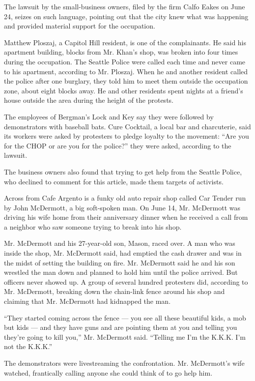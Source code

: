 The lawsuit by the small-business owners, filed by the firm Calfo Eakes
on June 24, seizes on such language, pointing out that the city knew
what was happening and provided material support for the occupation.

Matthew Ploszaj, a Capitol Hill resident, is one of the complainants. He
said his apartment building, blocks from Mr. Khan's shop, was broken
into four times during the occupation. The Seattle Police were called
each time and never came to his apartment, according to Mr. Ploszaj.
When he and another resident called the police after one burglary, they
told him to meet them outside the occupation zone, about eight blocks
away. He and other residents spent nights at a friend's house outside
the area during the height of the protests.

The employees of Bergman's Lock and Key say they were followed by
demonstrators with baseball bats. Cure Cocktail, a local bar and
charcuterie, said its workers were asked by protesters to pledge loyalty
to the movement: ``Are you for the CHOP or are you for the police?''
they were asked, according to the lawsuit.

The business owners also found that trying to get help from the Seattle
Police, who declined to comment for this article, made them targets of
activists.

Across from Cafe Argento is a funky old auto repair shop called Car
Tender run by John McDermott, a big soft-spoken man. On June 14, Mr.
McDermott was driving his wife home from their anniversary dinner when
he received a call from a neighbor who saw someone trying to break into
his shop.

Mr. McDermott and his 27-year-old son, Mason, raced over. A man who was
inside the shop, Mr. McDermott said, had emptied the cash drawer and was
in the midst of setting the building on fire. Mr. McDermott said he and
his son wrestled the man down and planned to hold him until the police
arrived. But officers never showed up. A group of several hundred
protesters did, according to Mr. McDermott, breaking down the chain-link
fence around his shop and claiming that Mr. McDermott had kidnapped the
man.

``They started coming across the fence --- you see all these beautiful
kids, a mob but kids --- and they have guns and are pointing them at you
and telling you they're going to kill you,'' Mr. McDermott said.
``Telling me I'm the K.K.K. I'm not the K.K.K.''

The demonstrators were livestreaming the confrontation. Mr. McDermott's
wife watched, frantically calling anyone she could think of to go help
him.

